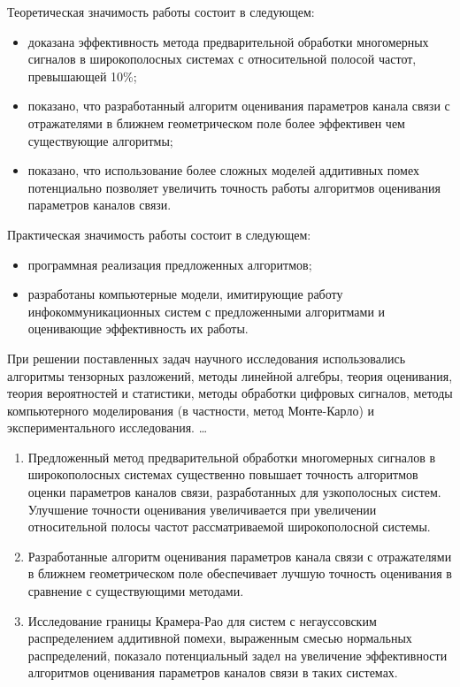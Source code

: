 {\influence} Теоретическая значимость работы состоит в следующем:
\begin{itemize}
	\item доказана эффективность метода предварительной обработки многомерных сигналов в широкополосных системах с относительной полосой частот, превышающей 10\%;
	\item показано, что разработанный алгоритм оценивания параметров канала связи с отражателями в ближнем геометрическом поле более эффективен чем существующие алгоритмы;
	\item показано, что использование более сложных моделей аддитивных помех потенциально позволяет увеличить точность работы алгоритмов оценивания параметров каналов связи.
\end{itemize}

Практическая значимость работы состоит в следующем:
\begin{itemize}
	\item программная реализация предложенных алгоритмов;
	\item разработаны компьютерные модели, имитирующие работу инфокоммуникационных систем с предложенными алгоритмами и оценивающие эффективность их работы.	
\end{itemize}

{\methods} При решении поставленных задач научного исследования использовались алгоритмы тензорных разложений, методы линейной алгебры, теория оценивания, теория вероятностей и статистики, методы обработки цифровых сигналов, методы компьютерного моделирования (в частности, метод Монте-Карло) и экспериментального исследования. \ldots

{}
\begin{enumerate}
  \item Предложенный метод предварительной обработки многомерных сигналов в широкополосных системах существенно повышает точность алгоритмов оценки параметров каналов связи, разработанных для узкополосных систем. Улучшение точности оценивания увеличивается при увеличении относительной полосы частот рассматриваемой широкополосной системы.
  \item Разработанные алгоритм оценивания параметров канала связи с отражателями в ближнем геометрическом поле обеспечивает лучшую точность оценивания в сравнение с существующими методами.
  \item Исследование границы Крамера-Рао для систем с негауссовским распределением аддитивной помехи, выраженным смесью нормальных распределений, показало потенциальный задел на увеличение эффективности алгоритмов оценивания параметров каналов связи в таких системах.
\end{enumerate}

